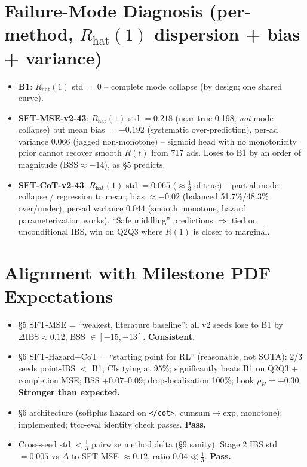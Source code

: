 \documentclass[10pt]{article}
\begin{document}
\section*{Failure-Mode Diagnosis (per-method, $R_\text{hat}(1)$ dispersion + bias + variance)}
\begin{itemize}
\item \textbf{B1}: $R_\text{hat}(1)$ std $=0$ -- complete mode collapse (by design; one shared curve).
\item \textbf{SFT-MSE-v2-43}: $R_\text{hat}(1)$ std $=0.218$ (near true 0.198; \emph{not} mode collapse) but mean bias $=+0.192$
(systematic over-prediction), per-ad variance $0.066$ (jagged non-monotone) -- sigmoid head with no monotonicity prior
cannot recover smooth $R(t)$ from 717 ads. Loses to B1 by an order of magnitude (BSS$\approx-14$), as \S5 predicts.
\item \textbf{SFT-CoT-v2-43}: $R_\text{hat}(1)$ std $=0.065$ ($\approx\tfrac{1}{3}$ of true) -- partial mode collapse / regression to mean;
bias $\approx -0.02$ (balanced 51.7\%/48.3\% over/under), per-ad variance $0.044$ (smooth monotone, hazard parameterization works).
``Safe middling'' predictions $\Rightarrow$ tied on unconditional IBS, win on Q2Q3 where $R(1)$ is closer to marginal.
\end{itemize}

\section*{Alignment with Milestone PDF Expectations}
\begin{itemize}
\item \S5 SFT-MSE = ``weakest, literature baseline'': all v2 seeds lose to B1 by $\Delta\text{IBS}\!\approx\!0.12$, BSS $\in[-15,-13]$. \textbf{Consistent.}
\item \S6 SFT-Hazard+CoT = ``starting point for RL'' (reasonable, not SOTA): 2/3 seeds point-IBS $<$ B1, CIs tying at 95\%;
significantly beats B1 on Q2Q3 + completion MSE; BSS $+0.07$--$0.09$; drop-localization 100\%; hook $\rho_H=+0.30$. \textbf{Stronger than expected.}
\item \S6 architecture (softplus hazard on \texttt{</cot>}, cumsum$\to$exp, monotone): implemented; ttcc-eval identity check passes. \textbf{Pass.}
\item Cross-seed std $<\tfrac{1}{3}$ pairwise method delta (\S9 sanity): Stage 2 IBS std $=0.005$ vs $\Delta$ to SFT-MSE $\approx 0.12$, ratio $0.04\ll\tfrac{1}{3}$. \textbf{Pass.}
\end{itemize}
\end{document}
